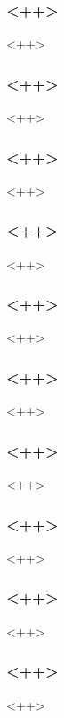 \begin{frame}[fragile]
\frametitle{<++>}
<++>
\end{frame}

\begin{frame}[fragile]
\frametitle{<++>}
<++>
\end{frame}

\begin{frame}[fragile]
\frametitle{<++>}
<++>
\end{frame}

\begin{frame}[fragile]
\frametitle{<++>}
<++>
\end{frame}

\begin{frame}[fragile]
\frametitle{<++>}
<++>
\end{frame}

\begin{frame}[fragile]
\frametitle{<++>}
<++>
\end{frame}

\begin{frame}[fragile]
\frametitle{<++>}
<++>
\end{frame}

\begin{frame}[fragile]
\frametitle{<++>}
<++>
\end{frame}

\begin{frame}[fragile]
\frametitle{<++>}
<++>
\end{frame}

\begin{frame}[fragile]
\frametitle{<++>}
<++>
\end{frame}




